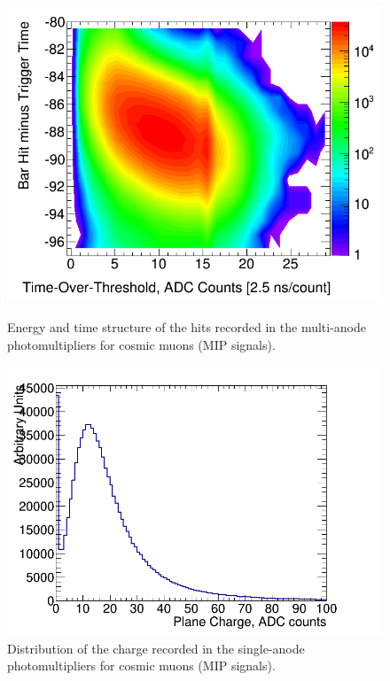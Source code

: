 \documentclass[a4paper,11pt]{article}
\begin{document}
\begin{figure}
 \centering
 \begin{minipage}[b]{.49\textwidth}
  \centering
  \includegraphics[width=.9\textwidth]{tot_vs_deltat_log_scale_2D.png}
  \caption{Energy and time structure of the hits recorded in the multi-anode photomultipliers for cosmic muons (MIP signals).}
  \label{fig:tot_vs_deltat}
 \end{minipage}
 \hfill
 \begin{minipage}[b]{.49\textwidth}
  \centering
  \includegraphics[width=\textwidth]{plane_charge_hist.png}
  \caption{Distribution of the charge recorded in the single-anode photomultipliers for cosmic muons (MIP signals).}
  \label{fig:plane_charge}
 \end{minipage}
\end{figure} 
\end{document}
